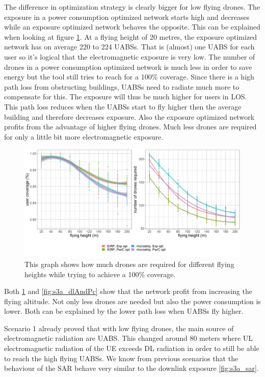 The difference in optimization strategy is clearly bigger for low flying drones. The exposure in a power consumption  optimized network starts high and 
decreases while an exposure optimized network behaves the opposite. This can be explained when looking at figure \ref{fig:s3a_numDronesAndCov}.
At a flying height of 20 metres, the exposure optimized network has on average 220 to 224 \gls{UABS}s. That is (almost) one \gls{UABS} for each user
so it's logical that the electromagnetic exposure is very low.
The number of drones in a power consumption optimized network is much less in order to save energy but the tool still tries to reach for a 100\% coverage. Since 
there is a high path loss from obstructing buildings, \gls{UABS}s need to radiate much more to compensate for this. The exposure will thus be much higher for 
users in \gls{LOS}. This path loss reduces when the \gls{UABS}s start to fly higher then the average  building and therefore decreases exposure.
Also the exposure optimized network profits from the advantage of higher flying drones. Much less drones are required for only a little bit more 
electromagnetic exposure.

\begin{figure}[]
  \includegraphics[width=\textwidth]{../results/s3/fhvsnumdronesAndCov.png}
  \caption{This graph shows how much drones are required for different flying heights while trying to achieve a 100\% coverage.}
  \label{fig:s3a_numDronesAndCov}
\end{figure}

Both \ref{fig:s3a_numDronesAndCov} and \ref{fig:s3a_dlAndPc} show that the network profit from increasing the flying altitude. 
Not only less drones are needed but also the power consumption is lower. Both can be explained by the lower path loss when \gls{UABS}s fly higher.

Scenario 1 already proved that with low flying drones, the main source of electromagnetic radiation are \gls{UABS}. 
This changed around 80 meters where \gls{UL} electromagnetic radiation of the \gls{UE}
 exceeds \gls{DL} radiation in order to still be able to reach the high flying \gls{UABS}s. We know from 
 previous scenarios that the behaviour of the \gls{SAR} behave very similar to the downlink exposure \ref{fig:s3a_sar}.


